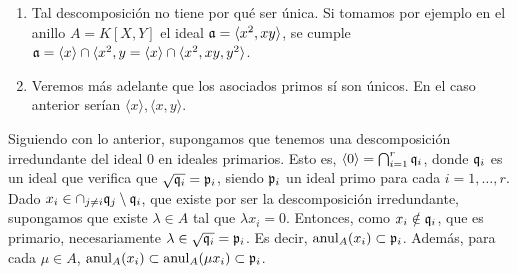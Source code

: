\documentclass[../main.tex]{subfiles}
\begin{document}
\begin{remark}
\begin{enumerate}
    \item Tal descomposición no tiene por qué ser única. Si tomamos por ejemplo en el anillo $A=K[X,Y]$ el ideal $\mathfrak{a}=\langle x^2,xy\rangle$, se cumple $\mathfrak{a}=\langle x\rangle\cap\langle x^2,y=\langle x\rangle\cap\langle x^2,xy,y^2\rangle$.
    \item  Veremos más adelante que los asociados primos sí son únicos. En el caso anterior serían $\langle x\rangle, \langle x,y\rangle$.
\end{enumerate}
\end{remark}
Siguiendo con lo anterior, supongamos que tenemos una descomposición irredundante del ideal $0$ en ideales primarios. Esto es, $\langle 0\rangle=\bigcap_{i=1}^r\mathfrak{q}_i$, donde $\mathfrak{q}_i$ es un ideal que verifica que $\sqrt{\mathfrak{q}_i}=\mathfrak{p}_i$, siendo $\mathfrak{p}_i$ un ideal primo para cada $i=1,\dots,r$. Dado $x_i\in\cap_{j\neq i}\mathfrak{q}_j\setminus\mathfrak{q}_i$, que existe por ser la descomposición irredundante, supongamos que existe $\lambda\in A$ tal que $\lambda x_i=0$. Entonces, como $x_i\notin\mathfrak{q}_i$, que es primario, necesariamente $\lambda\in\sqrt{\mathfrak{q}_i}=\mathfrak{p}_i$. Es decir, $\operatorname{anul}_A(x_i)\subset\mathfrak{p}_i$. Además, para cada $\mu\in A$, $\operatorname{anul}_A(x_i)\subset\operatorname{anul}_A(\mu x_i)\subset\mathfrak{p}_i$.
\end{document}
